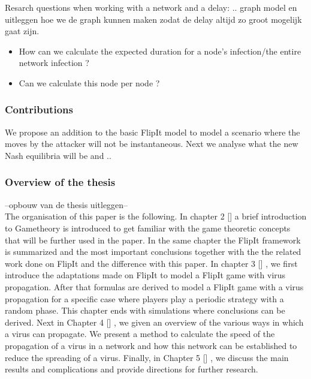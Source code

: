 Resarch questions when working with a network and a delay: .. graph model en uitleggen hoe we de graph kunnen maken zodat de delay altijd zo groot mogelijk gaat zijn. 
\begin{itemize}
\item How can we calculate the expected duration for a node's infection/the entire network infection ?
\item Can we calculate this node per node ?
\end{itemize}
%

\subsubsection{Contributions}
We propose an addition to the basic FlipIt model to model a scenario where the moves by the attacker will not be instantaneous. Next we analyse what the new Nash equilibria will be and .. \\

\subsubsection{Overview of the thesis}
--opbouw van de thesis uitleggen-- \\

The organisation of this paper is the following.  In chapter 2 []   a brief introduction to Gametheory is introduced to get familiar with the game theoretic concepts that will be further used in the paper. In the same chapter the FlipIt framework  is summarized and the most important conclusions together with the the related work done on FlipIt and the difference with this paper.
In chapter 3  []  , we first introduce the adaptations made on FlipIt to model a FlipIt game with virus propagation. After that formulas are derived to model a FlipIt game with a virus propagation for a specific case where players play a periodic strategy with a random phase. This chapter ends with simulations where conclusions can be derived.
Next in Chapter 4 [] , we given an overview of the various ways in which a virus can propagate. We present a method to calculate the speed of the propagation of a virus in a network and how this network can be established to reduce the spreading of a virus.
Finally, in Chapter 5 [] , we discuss the main results and complications and provide directions for further research.

